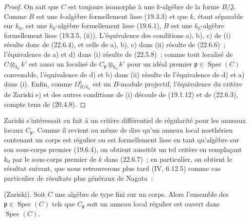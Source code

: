 \begin{proof}
On sait que $C$ est toujours isomorphe à une $k$-algèbre de la forme
$B/\mathfrak J$. Comme $B$ est une $k$-algèbre formellement lisse (19.3.3) et
que $k$, étant séparable sur $k_0$, est une $k_0$-algèbre formellement lisse
(19.6.1), $B$ est une $k_0$-algèbre formellement lisse (19.3.5, (ii)).
L'équivalence des conditions a), b), c) de (i) résulte donc de (22.6.4), et
celle de a), b), c) dans (ii) résulte de (22.6.6)~; l'équivalence de a) et d)
dans (i) résulte de (22.5.8)~; comme tout localisé de $C\otimes_{k_0}k'$ est
aussi un localisé de $C_{\mathfrak p}\otimes_{k_0}k'$ pour un idéal premier
$\mathfrak p\in\operatorname{Spec}(C)$ convenable, l'équivalence de d) et b) dans (ii)
résulte de l'équivalence de d) et a) dans (i). Enfin, comme
$\Omega^1_{B/k_0}$ est un $B$-module projectif, l'équivalence du critère de
Zariski e) et des autres conditions de (i) découle de (19.1.12) et de
(22.6.3), compte tenu de (20.4.8).
\end{proof}

Zariski s'intéressait en fait à un critère différentiel de régularité pour les
anneaux locaux $C_{\mathfrak p}$. Comme il revient au même de dire qu'un anneau
local noethérien contenant un corps est régulier ou est formellement lisse en
tant qu'algèbre sur son sous-corps premier (19.6.4), on obtient aussitôt un tel
critère en remplaçant $k_0$ par le sous-corps premier de $k$ dans (22.6.7)~; en
particulier, on obtient le résultat suivant, que nous retrouverons plus tard
(IV, 6.12.5) comme cas particulier de résultats plus généraux de Nagata~:

\begin{corollary}[22.6.8]
\label{0.22.6.8-fr}
\textnormal{(Zariski).}
Soit $C$ une algèbre de type fini sur un corps. Alors l'ensemble des
$\mathfrak p\in\operatorname{Spec}(C)$ tels que $C_{\mathfrak p}$ soit un anneau local
régulier est ouvert dans $\operatorname{Spec}(C)$.
\end{corollary}

